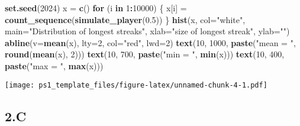 \documentclass[
]{article}
\newenvironment{Shaded}{\begin{snugshade}}{\end{snugshade}}
\newcommand{\AttributeTok}[1]{\textcolor[rgb]{0.13,0.29,0.53}{#1}}
\newcommand{\ControlFlowTok}[1]{\textcolor[rgb]{0.13,0.29,0.53}{\textbf{#1}}}
\newcommand{\DecValTok}[1]{\textcolor[rgb]{0.00,0.00,0.81}{#1}}
\newcommand{\FloatTok}[1]{\textcolor[rgb]{0.00,0.00,0.81}{#1}}
\newcommand{\FunctionTok}[1]{\textcolor[rgb]{0.13,0.29,0.53}{\textbf{#1}}}
\newcommand{\NormalTok}[1]{#1}
\newcommand{\OtherTok}[1]{\textcolor[rgb]{0.56,0.35,0.01}{#1}}
\newcommand{\SpecialCharTok}[1]{\textcolor[rgb]{0.81,0.36,0.00}{\textbf{#1}}}
\newcommand{\StringTok}[1]{\textcolor[rgb]{0.31,0.60,0.02}{#1}}
\begin{document}
\begin{Shaded}
\begin{Highlighting}[]
\FunctionTok{set.seed}\NormalTok{(}\DecValTok{2024}\NormalTok{)}
\NormalTok{x }\OtherTok{=} \FunctionTok{c}\NormalTok{()}
\ControlFlowTok{for}\NormalTok{ (i }\ControlFlowTok{in} \DecValTok{1}\SpecialCharTok{:}\DecValTok{10000}\NormalTok{) \{}
\NormalTok{  x[i] }\OtherTok{=} \FunctionTok{count\_sequence}\NormalTok{(}\FunctionTok{simulate\_player}\NormalTok{(}\FloatTok{0.5}\NormalTok{))}
\NormalTok{\}}
\FunctionTok{hist}\NormalTok{(x, }\AttributeTok{col=}\StringTok{"white"}\NormalTok{, }\AttributeTok{main=}\StringTok{"Distribution of longest streaks"}\NormalTok{,}
     \AttributeTok{xlab=}\StringTok{"size of longest streak"}\NormalTok{, }\AttributeTok{ylab=}\StringTok{""}\NormalTok{)}
\FunctionTok{abline}\NormalTok{(}\AttributeTok{v=}\FunctionTok{mean}\NormalTok{(x), }\AttributeTok{lty=}\DecValTok{2}\NormalTok{, }\AttributeTok{col=}\StringTok{"red"}\NormalTok{, }\AttributeTok{lwd=}\DecValTok{2}\NormalTok{)}
\FunctionTok{text}\NormalTok{(}\DecValTok{10}\NormalTok{, }\DecValTok{1000}\NormalTok{, }\FunctionTok{paste}\NormalTok{(}\StringTok{"mean = "}\NormalTok{, }\FunctionTok{round}\NormalTok{(}\FunctionTok{mean}\NormalTok{(x), }\DecValTok{2}\NormalTok{)))}
\FunctionTok{text}\NormalTok{(}\DecValTok{10}\NormalTok{, }\DecValTok{700}\NormalTok{, }\FunctionTok{paste}\NormalTok{(}\StringTok{"min = "}\NormalTok{, }\FunctionTok{min}\NormalTok{(x)))}
\FunctionTok{text}\NormalTok{(}\DecValTok{10}\NormalTok{, }\DecValTok{400}\NormalTok{, }\FunctionTok{paste}\NormalTok{(}\StringTok{"max = "}\NormalTok{, }\FunctionTok{max}\NormalTok{(x)))}
\end{Highlighting}
\end{Shaded}

\texttt{[image: ps1\_template\_files/figure-latex/unnamed-chunk-4-1.pdf]}

\hypertarget{c}{%
\subsection{2.C}\label{c}}
\end{document}
